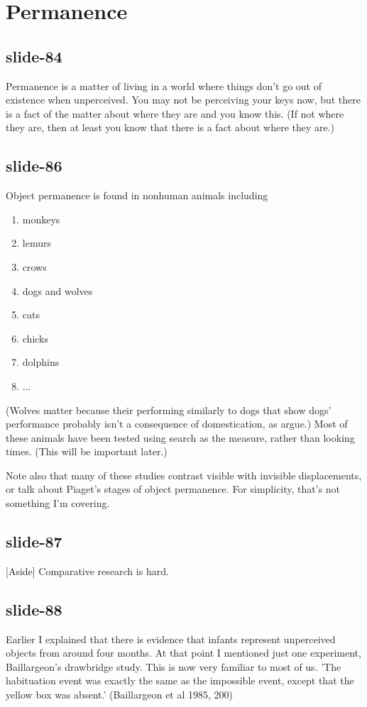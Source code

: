 \documentclass[12pt,\papersize]{extarticle}
\begin{document}
\section{Permanence}
 
 
\subsection{slide-84}
Permanence is a matter of living in a world where things don't go out of existence when unperceived.
You may not be perceiving your keys now, but there is a fact of the matter about where they are and you know this. (If not where they are, then at least you know that there is a fact about where they are.)
 
 
\subsection{slide-86}
Object permanence is found in nonhuman animals including
\begin{enumerate}
\item monkeys \citep{santos:2006_cotton-top}
\item lemurs \citep{deppe:2009_object}
\item crows \citep{hoffmann:2011_ontogeny}
\item dogs and wolves \citep{fiset:2013_object}
\item cats \citep{triana:1981_object}
\item chicks \citep{chiandetti:2011_chicks_op}
\item dolphins \citep{jaakkola:2010_what}
\item ...
\end{enumerate}
(Wolves matter because their performing similarly to dogs that show dogs' performance probably isn't a consequence of domestication, as \citet{fiset:2013_object} argue.)
Most of these animals have been tested using search as the measure, rather than looking times. (This will be important later.)
 
Note also that many of these studies contrast visible with invisible displacements, or talk about Piaget's stages of object permanence. For simplicity, that's not something I'm covering.
 
 
\subsection{slide-87}
[Aside] Comparative research is hard.
 
 
\subsection{slide-88}
Earlier I explained that there is evidence that infants represent unperceived objects from around four months.
At that point I mentioned just one experiment, Baillargeon's drawbridge study.
This is now very familiar to most of us.
'The habituation event was exactly the same as the impossible event, except that the yellow box was absent.' (Baillargeon et al 1985, 200)
 
\end{document}
